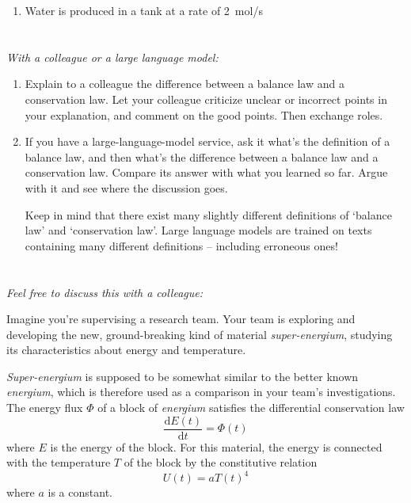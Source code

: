 \documentclass[a4paper,12pt,%
onecolumn,oneside,%
british%
]{memoir}
\newcommand*{\di}{\mathrm{d}}%
\renewcommand*{\|}[1][]{\nonscript\:#1\vert\nonscript\:\mathopen{}}
\newcommand*{\yE}{E}
\newcommand*{\yU}{U}
\newcommand*{\yH}{\varPhi}%
\newcommand*{\yT}{T}%
\begin{document}
\begin{enumerate}[exerc]
\item Water is produced in a tank at a rate of \qty{2}{mol/s}
\end{enumerate}



\section{}
\label{sec:diff_bal_cons_llm}
\emph{With a colleague or a large language model:}

\smallskip

\begin{enumerate}[exerc]
\item Explain to a colleague the difference between a balance law and a conservation law. Let your colleague criticize unclear or incorrect points in your explanation, and comment on the good points. Then exchange roles.
\item If you have a large-language-model service, ask it what's the definition of a balance law, and then what's the difference between a balance law and a conservation law. Compare its answer with what you learned so far. Argue with it and see where the discussion goes.

  Keep in mind that there exist many slightly different definitions of \enquote*{balance law} and \enquote*{conservation law}.  Large language models are trained on texts containing many different definitions -- including erroneous ones!
\end{enumerate}

\clearpage
\section{}
\label{sec:change_bal_or_const}

\emph{Feel free to discuss this with a colleague:}

\smallskip

Imagine you're supervising a research team. Your team is exploring and developing the new, ground-breaking kind of material \emph{super-energium}, studying its characteristics about energy and temperature.

\emph{Super-energium} is supposed to be somewhat similar to the better known \emph{energium}, which is therefore used as a comparison in your team's investigations. The energy flux $\yH$ of a block of \emph{energium} satisfies the differential conservation law
\begin{equation}\label{eq:energy_block}
  \frac{\di\yE(t)}{\di t} = \yH(t)
\end{equation}
where $\yE$ is the energy of the block. For this material, the energy is connected with the temperature $\yT$ of the block by the constitutive relation
\begin{equation}\label{eq:const_block}
  \yU(t) = a \yT(t)^{4}
\end{equation}
where $a$ is a constant.
\end{document}
